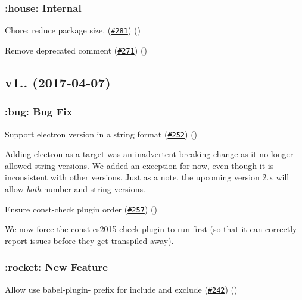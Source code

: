 \subsubsection*{\+:house\+: Internal}


\begin{DoxyItemize}
\item Chore\+: reduce package size. (\href{https://github.com/babel/babel-preset-env/pull/281}{\tt \#281}) ()
\item Remove deprecated comment (\href{https://github.com/babel/babel-preset-env/pull/271}{\tt \#271}) ()
\end{DoxyItemize}

\subsection*{v1.. (2017-\/04-\/07)}

\subsubsection*{\+:bug\+: Bug Fix}


\begin{DoxyItemize}
\item Support electron version in a string format (\href{https://github.com/babel/babel-preset-env/pull/252}{\tt \#252}) ()
\end{DoxyItemize}

Adding electron as a target was an inadvertent breaking change as it no longer allowed string versions. We added an exception for now, even though it is inconsistent with other versions. Just as a note, the upcoming version 2.\+x will allow {\itshape both} number and string versions.


\begin{DoxyItemize}
\item Ensure const-\/check plugin order (\href{https://github.com/babel/babel-preset-env/pull/257}{\tt \#257}) ()
\end{DoxyItemize}

We now force the {\ttfamily const-\/es2015-\/check} plugin to run first (so that it can correctly report issues before they get transpiled away).

\subsubsection*{\+:rocket\+: New Feature}


\begin{DoxyItemize}
\item Allow use {\ttfamily babel-\/plugin-\/} prefix for include and exclude (\href{https://github.com/babel/babel-preset-env/pull/242}{\tt \#242}) ()
\end{DoxyItemize}

